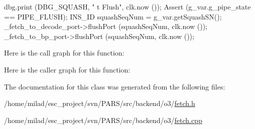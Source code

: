 \begin{DoxyCode}
                                    {
    dbg.print (DBG_SQUASH, "%
      t Flush", clk.now ());
    Assert (g_var.g_pipe_state == PIPE_FLUSH);
    INS_ID squashSeqNum = g_var.getSquashSN();
    _fetch_to_decode_port->flushPort (squashSeqNum, clk.now ());
    _fetch_to_bp_port->flushPort (squashSeqNum, clk.now ());
}
\end{DoxyCode}


Here is the call graph for this function:




Here is the caller graph for this function:




The documentation for this class was generated from the following files:\begin{DoxyCompactItemize}
\item 
/home/milad/esc\_\-project/svn/PARS/src/backend/o3/\hyperlink{o3_2fetch_8h}{fetch.h}\item 
/home/milad/esc\_\-project/svn/PARS/src/backend/o3/\hyperlink{o3_2fetch_8cpp}{fetch.cpp}\end{DoxyCompactItemize}

